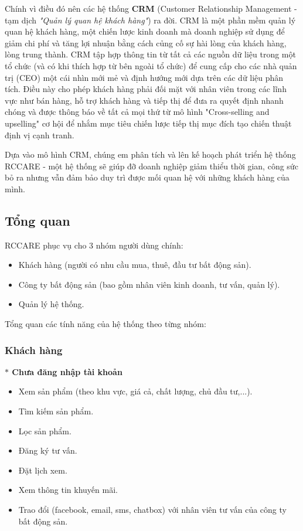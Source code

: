 \documentclass[12pt,a4paper]{article}
\begin{document}
    Chính vì điều đó nên các hệ thống \textbf{CRM} (Customer Relationship Management - tạm dịch \textit{"Quản lý quan hệ khách hàng"}) ra đời. CRM là một phần mềm quản lý quan hệ khách hàng, một chiến lược kinh doanh mà doanh nghiệp sử dụng để giảm chi phí và tăng lợi nhuận bằng cách củng cố sự hài lòng của khách hàng, lòng trung thành. CRM tập hợp thông tin từ tất cả các nguồn dữ liệu trong một tổ chức (và có khi thích hợp từ bên ngoài tổ chức) để cung cấp cho các nhà quản trị (CEO) một cái nhìn mới mẻ và định hướng mới dựa trên các dữ liệu phân tích. Điều này cho phép khách hàng phải đối mặt với nhân viên trong các lĩnh vực như bán hàng, hỗ trợ khách hàng và tiếp thị để đưa ra quyết định nhanh chóng và được thông báo về tất cả mọi thứ từ mô hình "Cross-selling and upselling" cơ hội để nhắm mục tiêu chiến lược tiếp thị mục đích tạo chiến thuật định vị cạnh tranh.

    Dựa vào mô hình CRM, chúng em phân tích và lên kế hoạch phát triển hệ thống RCCARE - một hệ thống sẽ giúp đỡ doanh nghiệp giảm thiểu thời gian, công sức bỏ ra nhưng vẫn đảm bảo duy trì được mối quan hệ với những khách hàng của mình.

    \subsection*{Tổng quan}
    RCCARE phục vụ cho 3 nhóm người dùng chính:
    \begin{itemize}
        \item Khách hàng (người có nhu cầu mua, thuê, đầu tư bất động sản).
        \item Công ty bất động sản (bao gồm nhân viên kinh doanh, tư vấn, quản lý).
        \item Quản lý hệ thống.
    \end{itemize}
    Tổng quan các tính năng của hệ thống theo từng nhóm:
    \subsubsection*{Khách hàng}
    \textbf{$\ast$ Chưa đăng nhập tài khoản}
    \begin{itemize}
        \item Xem sản phẩm (theo khu vực, giá cả, chất lượng, chủ đầu tư,...).
        \item Tìm kiếm sản phẩm.
        \item Lọc sản phẩm.
        \item Đăng ký tư vấn.
        \item Đặt lịch xem.
        \item Xem thông tin khuyến mãi.
        \item Trao đổi (facebook, email, sms, chatbox) với nhân viên tư vấn của công ty bất động sản.
    \end{itemize}
\end{document}
